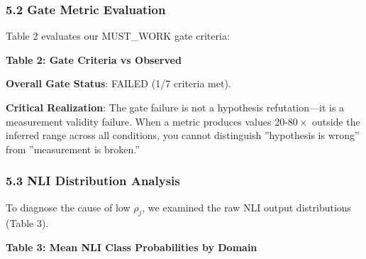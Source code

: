 \subsubsection{5.2 Gate Metric Evaluation}

Table 2 evaluates our MUST\_WORK gate criteria:

\textbf{Table 2: Gate Criteria vs Observed}

\begin{table}[htbp]
\centering
{}
\end{table}

\textbf{Overall Gate Status}: FAILED (1/7 criteria met).

\textbf{Critical Realization}: The gate failure is not a hypothesis refutation---it is a measurement validity failure. When a metric produces values 20-$80\times$ outside the inferred range across all conditions, you cannot distinguish ''hypothesis is wrong'' from ''measurement is broken.''

\subsubsection{5.3 NLI Distribution Analysis}

To diagnose the cause of low $\rho_j$, we examined the raw NLI output distributions (Table 3).

\textbf{Table 3: Mean NLI Class Probabilities by Domain}

\begin{table}[htbp]
\centering
{}
\end{table}

